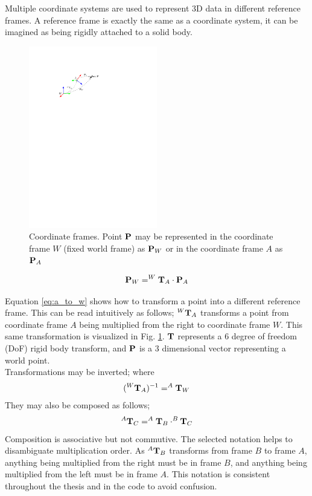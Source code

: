 Multiple coordinate systems are used to represent 3D data in different reference frames.  A reference frame is exactly the same as a coordinate system, it can be imagined as being rigidly attached to a solid body.

\begin{figure}[h]
  \centering
      \includegraphics[width=0.5\textwidth]{chapters/images/coord_sys}
  \caption{Coordinate frames. Point $\mathbf{P}$ may be represented in the coordinate frame  $W$ (fixed world frame) as $\mathbf{P}_W$ or in the coordinate frame $A$ as $\mathbf{P}_A$}
  \label{fig:coord_sys}
\end{figure}

\begin{align}
 \mathbf{P}_W = ^W\mathbf{T}_A \cdot \mathbf{P}_A
 \label{eq:a_to_w}
\end{align}

Equation \ref{eq:a_to_w} shows how to transform a point into a different reference frame.  This can be read intuitively as follows; $^W\mathbf{T}_A$ transforms a point from coordinate frame $A$ being multiplied from the right to coordinate frame $W$.  This same transformation is visualized in Fig. \ref{fig:coord_sys}.  $\mathbf{T}$ represents a 6 degree of freedom (DoF) rigid body transform, and $\mathbf{P}$ is a 3 dimensional vector representing a world point. \\
Transformations may be inverted; where 
\begin{align}
 (^W\mathbf{T}_A)^{-1} = ^A\mathbf{T}_W
\end{align}
They may also be composed as follows; 
\begin{align}
 ^A\mathbf{T}_C = ^A\mathbf{T}_B \cdot ^B\mathbf{T}_C
\end{align}
Composition is associative but not commutive.  The selected notation helps to disambiguate multiplication order.  As $^A\mathbf{T}_B$ transforms from frame $B$ to frame $A$, anything being multiplied from the right must be in frame $B$, and anything being multiplied from the left must be in frame $A$.  This notation is consistent throughout the thesis and in the code to avoid confusion.

